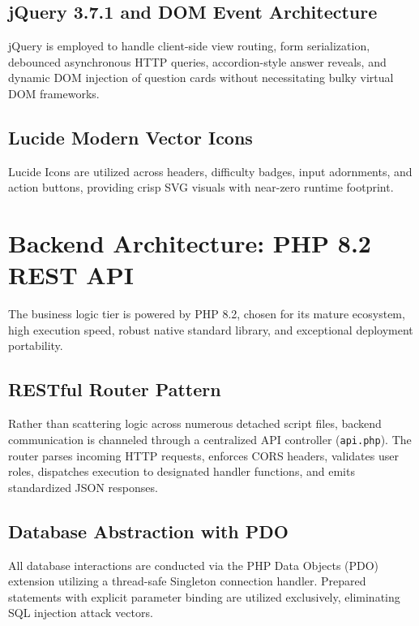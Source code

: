 \documentclass[12pt,a4paper]{report}
\begin{document}
\subsection{jQuery 3.7.1 and DOM Event Architecture}
jQuery is employed to handle client-side view routing, form serialization, debounced asynchronous HTTP queries, accordion-style answer reveals, and dynamic DOM injection of question cards without necessitating bulky virtual DOM frameworks.

\subsection{Lucide Modern Vector Icons}
Lucide Icons are utilized across headers, difficulty badges, input adornments, and action buttons, providing crisp SVG visuals with near-zero runtime footprint.

\section{Backend Architecture: PHP 8.2 REST API}
The business logic tier is powered by PHP 8.2, chosen for its mature ecosystem, high execution speed, robust native standard library, and exceptional deployment portability.

\subsection{RESTful Router Pattern}
Rather than scattering logic across numerous detached script files, backend communication is channeled through a centralized API controller (\texttt{api.php}). The router parses incoming HTTP requests, enforces CORS headers, validates user roles, dispatches execution to designated handler functions, and emits standardized JSON responses.

\subsection{Database Abstraction with PDO}
All database interactions are conducted via the PHP Data Objects (PDO) extension utilizing a thread-safe Singleton connection handler. Prepared statements with explicit parameter binding are utilized exclusively, eliminating SQL injection attack vectors.
\end{document}
